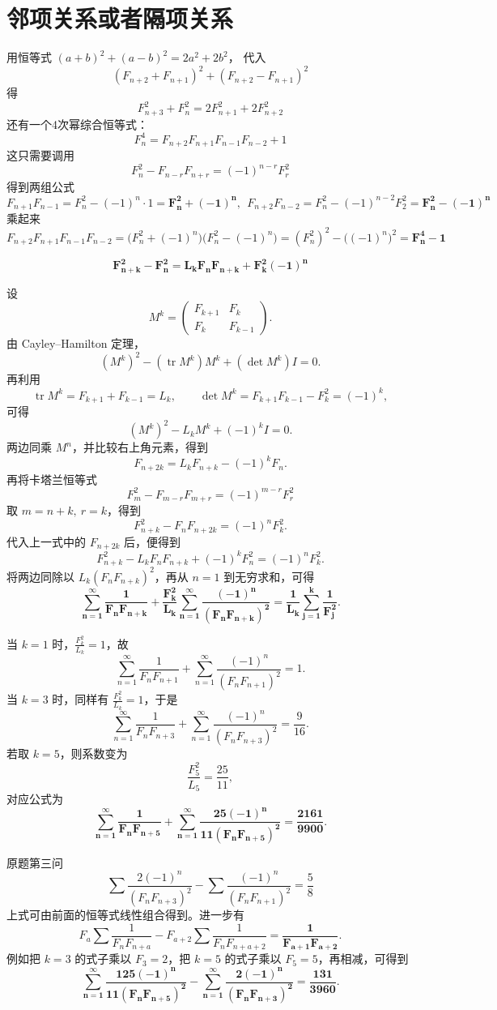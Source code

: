 \section{邻项关系或者隔项关系}
用恒等式 $(a+b)^2+(a-b)^2 = 2a^2+2b^2$，
代入 $$ (F_{n+2} + F_{n+1})^2 + (F_{n+2} - F_{n+1})^2 $$ 得
\[F_{n+3}^2 + F_n^2 = 2F_{n+1}^2 + 2F_{n+2}^2\]
还有一个4次幂综合恒等式：\[F_n^4 = F_{n+2}F_{n+1}F_{n-1}F_{n-2} + 1\]
这只需要调用\[F_n^2 - F_{n-r}F_{n+r} = (-1)^{n-r}F_r^2\]
得到两组公式\[F_{n+1}F_{n-1} = F_n^2 - (-1)^n \cdot 1 = \mathbf{F_n^2 + (-1)^n},~~F_{n+2}F_{n-2} = F_n^2 - (-1)^{n-2} F_2^2 = \mathbf{F_n^2 - (-1)^n}\]
乘起来$$ F_{n+2}F_{n+1}F_{n-1}F_{n-2} = \big(F_n^2 + (-1)^n\big)\big(F_n^2 - (-1)^n\big) = (F_n^2)^2 - \big((-1)^n\big)^2 = \mathbf{F_n^4 - 1} $$

\begin{conclusion}
\[\mathbf{F_{n+k}^2 - F_n^2 = L_k F_n F_{n+k} + F_k^2 (-1)^n} \]
\end{conclusion}
设
\[
M^k = \begin{pmatrix} F_{k+1} & F_k \\ F_k & F_{k-1} \end{pmatrix}.
\]
由 Cayley--Hamilton 定理，
\[
(M^k)^2-(\operatorname{tr}M^k)M^k+(\det M^k)I=0.
\]
再利用
\[
\operatorname{tr}M^k = F_{k+1}+F_{k-1}=L_k,\qquad
\det M^k = F_{k+1}F_{k-1}-F_k^2 = (-1)^k,
\]
可得
\[
(M^k)^2-L_kM^k+(-1)^kI=0.
\]
两边同乘 \(M^n\)，并比较右上角元素，得到
\[
F_{n+2k}=L_kF_{n+k}-(-1)^kF_n.
\]
再将卡塔兰恒等式
\[
F_m^2-F_{m-r}F_{m+r}=(-1)^{m-r}F_r^2
\]
取 \(m=n+k,\ r=k\)，得到
\[
F_{n+k}^2-F_nF_{n+2k}=(-1)^nF_k^2.
\]
代入上一式中的 \(F_{n+2k}\) 后，便得到
\[
F_{n+k}^2-L_kF_nF_{n+k}+(-1)^kF_n^2 = (-1)^nF_k^2.
\]
将两边同除以 \(L_k(F_nF_{n+k})^2\)，再从 \(n=1\) 到无穷求和，可得
\[
\mathbf{ \sum_{n=1}^\infty \frac{1}{F_n F_{n+k}} + \frac{F_k^2}{L_k} \sum_{n=1}^\infty \frac{(-1)^n}{(F_n F_{n+k})^2} = \frac{1}{L_k} \sum_{j=1}^k \frac{1}{F_j^2} } .
\]

当 \(k=1\) 时，\(\frac{F_k^2}{L_k}=1\)，故
\[
\sum_{n=1}^{\infty}\frac{1}{F_n F_{n+1}} + \sum_{n=1}^{\infty}\frac{(-1)^n}{(F_n F_{n+1})^2} = 1.
\]
当 \(k=3\) 时，同样有 \(\frac{F_k^2}{L_k}=1\)，于是
\[
\sum_{n=1}^{\infty}\frac{1}{F_n F_{n+3}} + \sum_{n=1}^{\infty}\frac{(-1)^n}{(F_n F_{n+3})^2} = \frac{9}{16}.
\]
若取 \(k=5\)，则系数变为
\[
\frac{F_5^2}{L_5}=\frac{25}{11},
\]
对应公式为
\[
\mathbf{\sum_{n=1}^\infty \frac{1}{F_n F_{n+5}} + \sum_{n=1}^\infty \frac{25(-1)^n}{11(F_n F_{n+5})^2} = \frac{2161}{9900}}.
\]

原题第三问
\[
\sum \frac{2(-1)^n}{(F_n F_{n+3})^2} - \sum \frac{(-1)^n}{(F_n F_{n+1})^2} = \frac{5}{8}
\]
上式可由前面的恒等式线性组合得到。进一步有
\[
F_a \sum \frac{1}{F_n F_{n+a}} - F_{a+2} \sum \frac{1}{F_n F_{n+a+2}} = \mathbf{\frac{1}{F_{a+1}F_{a+2}}}.
\]
例如把 \(k=3\) 的式子乘以 \(F_3=2\)，把 \(k=5\) 的式子乘以 \(F_5=5\)，再相减，可得到
\[
\mathbf{ \sum_{n=1}^\infty \frac{125(-1)^n}{11(F_n F_{n+5})^2} - \sum_{n=1}^\infty \frac{2(-1)^n}{(F_n F_{n+3})^2} = \frac{131}{3960} } .
\]

